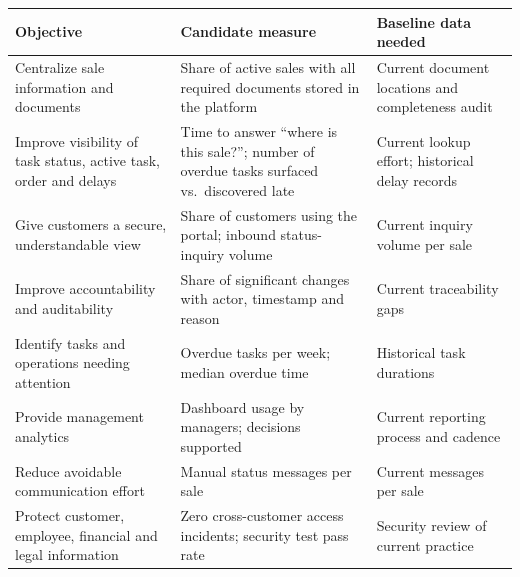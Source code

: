 \documentclass[11pt,a4paper]{article}
\begin{document}
\begin{longtable}{@{}L{4.6cm}L{5.8cm}L{5.4cm}@{}}
	\toprule
	\textbf{Objective}                                               & \textbf{Candidate measure}                                                                    & \textbf{Baseline data
		                                                                                                                                                                   needed}                            \\
	\midrule
	\endhead
	Centralize sale information and documents                        & Share of active sales with all
	required documents stored in the platform                        & Current document locations and
	completeness audit                                                                                                                                                                                                 \\
	Improve visibility of task status, active task, order and delays & Time to answer ``where is this sale?''; number of overdue tasks surfaced vs.\ discovered late & Current lookup effort; historical delay records \\
	Give customers a secure, understandable view                     & Share of customers using the portal; inbound status-inquiry volume                            & Current inquiry volume per sale                 \\
	Improve accountability and auditability                          & Share of significant changes with actor, timestamp and reason                                 & Current traceability gaps                       \\
	Identify tasks and operations needing attention                  & Overdue tasks per week; median overdue time                                                   & Historical task durations                       \\
	Provide management analytics                                     & Dashboard usage by managers; decisions supported                                              & Current reporting process and cadence           \\
	Reduce avoidable communication effort                            & Manual status messages per sale                                                               & Current messages per sale                       \\
	Protect customer, employee, financial and legal information      & Zero cross-customer access incidents; security test pass rate                                 & Security review of current practice             \\
	\bottomrule
\end{longtable}
\end{document}
